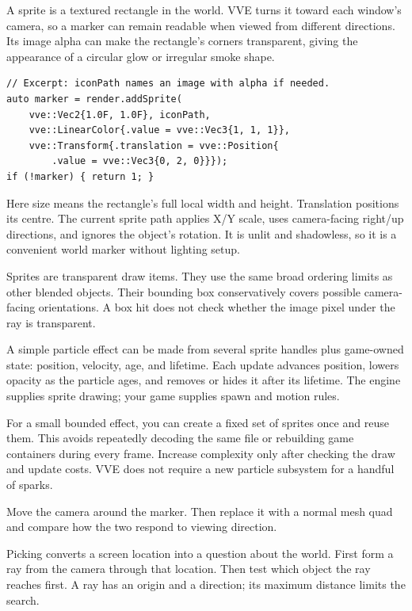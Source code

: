 \documentclass[11pt,a4paper]{article}
\begin{document}
A sprite is a textured rectangle in the world. VVE turns it toward each window's camera, so a marker can remain readable when viewed from different directions. Its image alpha can make the rectangle's corners transparent, giving the appearance of a circular glow or irregular smoke shape.
\begin{lstlisting}
// Excerpt: iconPath names an image with alpha if needed.
auto marker = render.addSprite(
    vve::Vec2{1.0F, 1.0F}, iconPath,
    vve::LinearColor{.value = vve::Vec3{1, 1, 1}},
    vve::Transform{.translation = vve::Position{
        .value = vve::Vec3{0, 2, 0}}});
if (!marker) { return 1; }
\end{lstlisting}
Here size means the rectangle's full local width and height. Translation positions its centre. The current sprite path applies X/Y scale, uses camera-facing right/up directions, and ignores the object's rotation. It is unlit and shadowless, so it is a convenient world marker without lighting setup.

Sprites are transparent draw items. They use the same broad ordering limits as other blended objects. Their bounding box conservatively covers possible camera-facing orientations. A box hit does not check whether the image pixel under the ray is transparent.

A simple particle effect can be made from several sprite handles plus game-owned state: position, velocity, age, and lifetime. Each update advances position, lowers opacity as the particle ages, and removes or hides it after its lifetime. The engine supplies sprite drawing; your game supplies spawn and motion rules.

For a small bounded effect, you can create a fixed set of sprites once and reuse them. This avoids repeatedly decoding the same file or rebuilding game containers during every frame. Increase complexity only after checking the draw and update costs. VVE does not require a new particle subsystem for a handful of sparks.

\begin{tryit}Move the camera around the marker. Then replace it with a normal mesh quad and compare how the two respond to viewing direction.\end{tryit}

Picking converts a screen location into a question about the world. First form a ray from the camera through that location. Then test which object the ray reaches first. A ray has an origin and a direction; its maximum distance limits the search.
\end{document}
